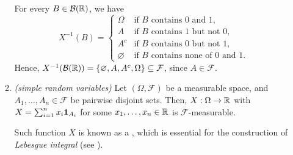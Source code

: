 \begin{enumerate}
\begin{enumerate}[label={(\arabic*)}]
\begin{pf}
For every \(B\in\mathcal{B}(\mathbb{R})\), we have
\[
X^{-1}(B)=\begin{cases}
\Omega&\text{if \(B\) contains \(0\) and \(1\),} \\
A&\text{if \(B\) contains \(1\) but not \(0\),} \\
A^c&\text{if \(B\) contains \(0\) but not \(1\),} \\
\varnothing&\text{if \(B\) contains none of \(0\) and \(1\).}
\end{cases}
\]
Hence, \(X^{-1}(\mathcal{B}(\mathbb{R}))=\{\varnothing,A,A^c,\Omega\}\subseteq \mathcal{F}\),
since \(A\in\mathcal{F}\).
\end{pf}
\item \emph{(simple random variables)} Let \((\Omega,\mathcal{F})\) be a
measurable space, and \(A_1,\dotsc,A_n\in\mathcal{F}\) be pairwise disjoint
sets.  Then, \(X:\Omega\to\mathbb{R}\) with \(X=\sum_{i=1}^{n}x_i\mathbf{1}_{A_i}\) for
some \(x_1,\dotsc,x_n\in\mathbb{R}\) is \(\mathcal{F}\)-measurable. \begin{note}
Such function \(X\) is known as a , which is
essential for the construction of \emph{Lebesgue integral} (see
).
\end{note}


\end{enumerate}
\end{enumerate}
